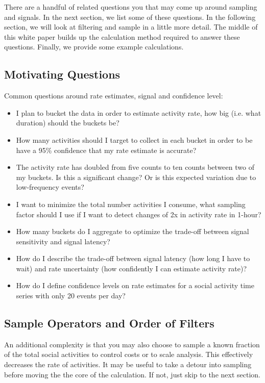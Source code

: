 \documentclass{article}
\begin{document}
There are a handful of related questions you that may come up around sampling and signals.  In the next section, we list some of these questions. In the following section, we will look at filtering and sample in a little more detail.  The middle of this white paper builds up the calculation method required to answer these questions. Finally, we provide some example calculations.

\subsection{Motivating Questions} 

Common questions around rate estimates, signal and confidence level:

\begin{itemize}
\item I plan to bucket the data in order to estimate activity rate, how big (i.e. what duration) should the buckets be? 
\item How many activities should I target to collect in each bucket in order to be have a 95\% confidence that my rate estimate is accurate? 
\item The activity rate has doubled from five counts to ten counts between two of my buckets. Is this a significant change? Or is this expected variation due to low-frequency events?
\item I want to minimize the total number activities I consume, what sampling factor should I use if I want to detect changes of 2x in activity rate in 1-hour?
\item How many buckets do I aggregate to optimize the trade-off between signal sensitivity and signal latency?
\item How do I describe the trade-off between signal latency (how long I have to wait) and rate uncertainty (how confidently I can estimate activity rate)?
\item How do I define confidence levels on rate estimates for a social activity time series with only 20 events per day?
\end{itemize}

\subsection{Sample Operators and Order of Filters} 

An additional complexity is that you may also choose to sample a known fraction of the total social activities to control costs or to scale analysis.  
This effectively decreases the rate of activities. It may be useful to take a detour into sampling before moving the the core 
of the calculation.  If not, just skip to the next section.
\end{document}

